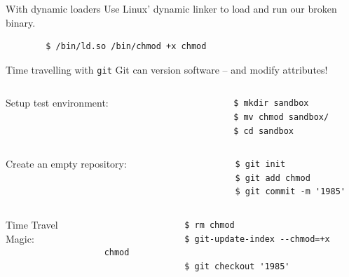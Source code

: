 \documentclass[aspectratio=169]{beamer}
\begin{document}
\begin{frame}[fragile]{With dynamic loaders}
    Use Linux' dynamic linker to load and run our broken binary.

    \begin{verbatim}
        $ /bin/ld.so /bin/chmod +x chmod
    \end{verbatim}
\end{frame}

\begin{frame}[fragile]{Time travelling with \texttt{git}}
    Git can version software -- and modify attributes!
    \vfill

    \pause
    \begin{columns}[onlytextwidth]
        \begin{column}{.5\textwidth}
            Setup test environment:
        \end{column}
        \begin{column}{.5\textwidth}
            \begin{verbatim}
                $ mkdir sandbox
                $ mv chmod sandbox/
                $ cd sandbox
            \end{verbatim}
        \end{column}
    \end{columns}

    \pause
    \begin{columns}[onlytextwidth]
        \begin{column}{.5\textwidth}
            Create an empty repository:
        \end{column}
        \begin{column}{.5\textwidth}
            \begin{verbatim}
                $ git init
                $ git add chmod
                $ git commit -m '1985'
            \end{verbatim}
        \end{column}
    \end{columns}

    \pause
    \begin{columns}[onlytextwidth]
        \begin{column}{.5\textwidth}
            \alert{Time Travel Magic:}
        \end{column}
        \begin{column}{.5\textwidth}
            \begin{verbatim}
                $ rm chmod
                $ git-update-index --chmod=+x chmod
                $ git checkout '1985'
            \end{verbatim}
        \end{column}
    \end{columns}
\end{frame}
\end{document}
